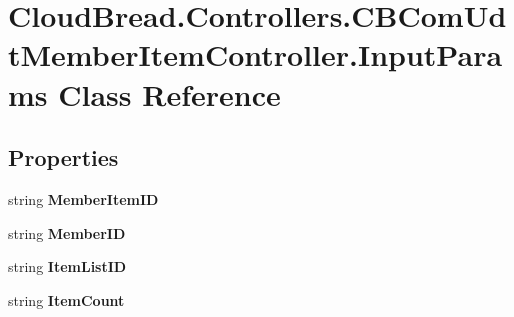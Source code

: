 \hypertarget{class_cloud_bread_1_1_controllers_1_1_c_b_com_udt_member_item_controller_1_1_input_params}{}\section{Cloud\+Bread.\+Controllers.\+C\+B\+Com\+Udt\+Member\+Item\+Controller.\+Input\+Params Class Reference}
\label{class_cloud_bread_1_1_controllers_1_1_c_b_com_udt_member_item_controller_1_1_input_params}
\subsection*{Properties}
\begin{DoxyCompactItemize}
\item 
string {\bfseries Member\+Item\+ID}\hypertarget{class_cloud_bread_1_1_controllers_1_1_c_b_com_udt_member_item_controller_1_1_input_params_a7e4815cac41eecfec43c3fb83e876515}{}\label{class_cloud_bread_1_1_controllers_1_1_c_b_com_udt_member_item_controller_1_1_input_params_a7e4815cac41eecfec43c3fb83e876515}

\item 
string {\bfseries Member\+ID}\hypertarget{class_cloud_bread_1_1_controllers_1_1_c_b_com_udt_member_item_controller_1_1_input_params_ab00603cd2de374d9a148dff888187959}{}\label{class_cloud_bread_1_1_controllers_1_1_c_b_com_udt_member_item_controller_1_1_input_params_ab00603cd2de374d9a148dff888187959}

\item 
string {\bfseries Item\+List\+ID}\hypertarget{class_cloud_bread_1_1_controllers_1_1_c_b_com_udt_member_item_controller_1_1_input_params_a67777e9d016e83236467fc2914432d73}{}\label{class_cloud_bread_1_1_controllers_1_1_c_b_com_udt_member_item_controller_1_1_input_params_a67777e9d016e83236467fc2914432d73}

\item 
string {\bfseries Item\+Count}\hypertarget{class_cloud_bread_1_1_controllers_1_1_c_b_com_udt_member_item_controller_1_1_input_params_a9d7d24000fe4d6964183e9f993f10711}{}\label{class_cloud_bread_1_1_controllers_1_1_c_b_com_udt_member_item_controller_1_1_input_params_a9d7d24000fe4d6964183e9f993f10711}


\end{DoxyCompactItemize}
